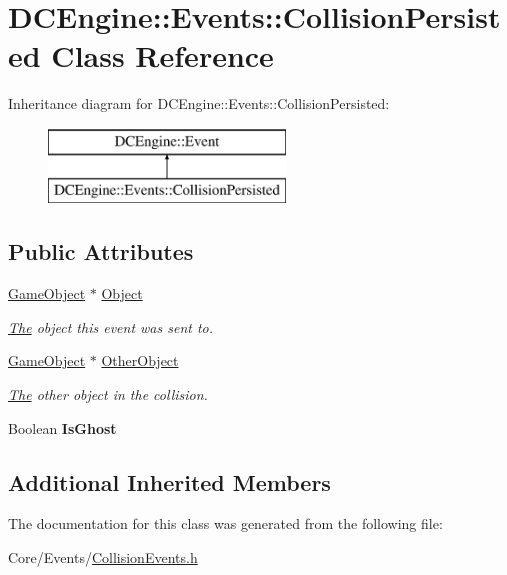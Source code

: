 \hypertarget{classDCEngine_1_1Events_1_1CollisionPersisted}{\section{D\-C\-Engine\-:\-:Events\-:\-:Collision\-Persisted Class Reference}
\label{classDCEngine_1_1Events_1_1CollisionPersisted}
}
Inheritance diagram for D\-C\-Engine\-:\-:Events\-:\-:Collision\-Persisted\-:\begin{figure}[H]
\begin{center}
\leavevmode
\includegraphics[height=2.000000cm]{classDCEngine_1_1Events_1_1CollisionPersisted}
\end{center}
\end{figure}
\subsection*{Public Attributes}
\begin{DoxyCompactItemize}
\item 
\hypertarget{classDCEngine_1_1Events_1_1CollisionPersisted_af3649bcb299ae8b07a1cb6cfb491727a}{\hyperlink{classDCEngine_1_1GameObject}{Game\-Object} $\ast$ \hyperlink{classDCEngine_1_1Events_1_1CollisionPersisted_af3649bcb299ae8b07a1cb6cfb491727a}{Object}}\label{classDCEngine_1_1Events_1_1CollisionPersisted_af3649bcb299ae8b07a1cb6cfb491727a}

\begin{DoxyCompactList}\small\item\em \hyperlink{classThe}{The} object this event was sent to. \end{DoxyCompactList}\item 
\hypertarget{classDCEngine_1_1Events_1_1CollisionPersisted_aec11577b5ecd7642ac94ef22246e5845}{\hyperlink{classDCEngine_1_1GameObject}{Game\-Object} $\ast$ \hyperlink{classDCEngine_1_1Events_1_1CollisionPersisted_aec11577b5ecd7642ac94ef22246e5845}{Other\-Object}}\label{classDCEngine_1_1Events_1_1CollisionPersisted_aec11577b5ecd7642ac94ef22246e5845}

\begin{DoxyCompactList}\small\item\em \hyperlink{classThe}{The} other object in the collision. \end{DoxyCompactList}\item 
\hypertarget{classDCEngine_1_1Events_1_1CollisionPersisted_a4bfcd4094f539ad601f10e91156ba1da}{Boolean {\bfseries Is\-Ghost}}\label{classDCEngine_1_1Events_1_1CollisionPersisted_a4bfcd4094f539ad601f10e91156ba1da}

\end{DoxyCompactItemize}
\subsection*{Additional Inherited Members}


The documentation for this class was generated from the following file\-:\begin{DoxyCompactItemize}
\item 
Core/\-Events/\hyperlink{CollisionEvents_8h}{Collision\-Events.\-h}\end{DoxyCompactItemize}
